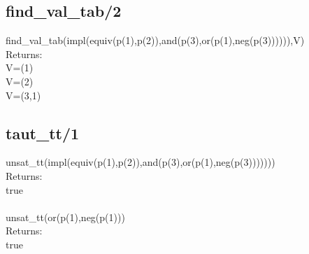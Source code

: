 \documentclass[a4paper,10pt]{article}
\begin{document}
\subsection*{find\_val\_tab/2}
\textsf{find\_val\_tab(impl(equiv(p(1),p(2)),and(p(3),or(p(1),neg(p(3)))))),V)}\\
Returns:\\
\textsf{V=(1)\\
		V=(2)\\
		V=(3,1)}\\
\subsection*{taut\_tt/1}
\textsf{unsat\_tt(impl(equiv(p(1),p(2)),and(p(3),or(p(1),neg(p(3)))))))}\\
Returns:\\
\textsf{true}
\\\\
\textsf{unsat\_tt(or(p(1),neg(p(1)))}\\
Returns:\\
\textsf{true}
\newpage
\end{document}
